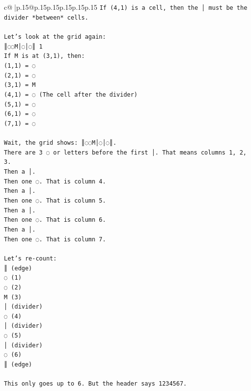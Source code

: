 \documentclass{article}
\begin{document}
{\begin{supertabular}{c@{$\;$}|p{.15\linewidth}@{}p{.15\linewidth}p{.15\linewidth}p{.15\linewidth}p{.15\linewidth}p{.15\linewidth}}
{{{\texttt{If (4,1) is a cell, then the │ must be the divider *between* cells.} \\
\\ 
\texttt{Let's look at the grid again:} \\
\texttt{║◌◌M│◌│◌║ 1} \\
\texttt{If M is at (3,1), then:} \\
\texttt{(1,1) = ◌} \\
\texttt{(2,1) = ◌} \\
\texttt{(3,1) = M} \\
\texttt{(4,1) = ◌ (The cell after the divider)} \\
\texttt{(5,1) = ◌} \\
\texttt{(6,1) = ◌} \\
\texttt{(7,1) = ◌} \\
\\ 
\texttt{Wait, the grid shows: ║◌◌M│◌│◌║.} \\
\texttt{There are 3 ◌ or letters before the first │. That means columns 1, 2, 3.} \\
\texttt{Then a │.} \\
\texttt{Then one ◌. That is column 4.} \\
\texttt{Then a │.} \\
\texttt{Then one ◌. That is column 5.} \\
\texttt{Then a │.} \\
\texttt{Then one ◌. That is column 6.} \\
\texttt{Then a │.} \\
\texttt{Then one ◌. That is column 7.} \\
\\ 
\texttt{Let's re{-}count:} \\
\texttt{║ (edge)} \\
\texttt{◌ (1)} \\
\texttt{◌ (2)} \\
\texttt{M (3)} \\
\texttt{│ (divider)} \\
\texttt{◌ (4)} \\
\texttt{│ (divider)} \\
\texttt{◌ (5)} \\
\texttt{│ (divider)} \\
\texttt{◌ (6)} \\
\texttt{║ (edge)} \\
\\ 
\texttt{This only goes up to 6. But the header says 1234567.} \\
}}}
\end{supertabular}}
\end{document}
